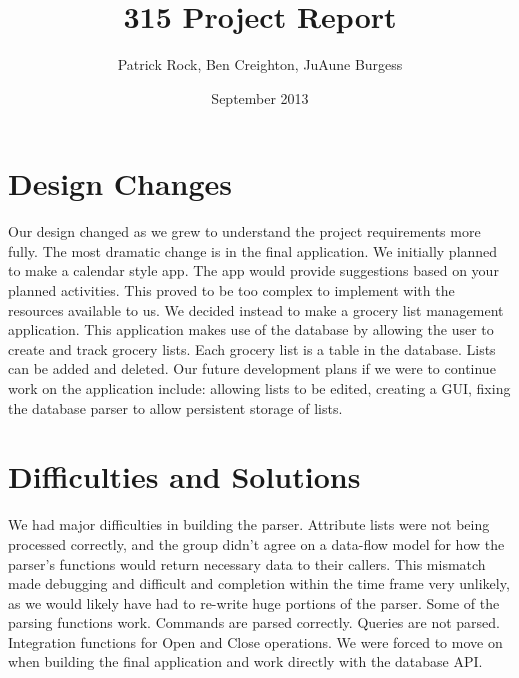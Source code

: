 \documentclass{article}
\title{315 Project Report}
\author{Patrick Rock, Ben Creighton, JuAune Burgess}
\date{September 2013}
\begin{document}
\maketitle

\section{Design Changes}
Our design changed as we grew to understand the project requirements more fully. The most dramatic change 
is in the final application. We initially planned to make a calendar style app. The app would provide suggestions
based on your planned activities. This proved to be too complex to implement with the resources available to us. 
We decided instead to make a grocery list management application. This application makes use of the database by 
allowing the user to create and track grocery lists. Each grocery list is a table in the database. Lists can 
be added and deleted. Our future development plans if we were to continue work on the application include:
allowing lists to be edited, creating a GUI, fixing the database parser to allow persistent storage of lists. 

\section{Difficulties and Solutions}
We had major difficulties in building the parser.
Attribute lists were not being processed correctly, and the group didn’t agree on a data-flow model for how the
parser's functions would return necessary data to their callers. This mismatch made debugging and difficult and
completion within the time frame very unlikely, as we would likely have had to re-write huge portions of the parser.
Some of the parsing functions work. Commands are parsed correctly. Queries are not parsed. Integration functions
for Open and Close operations. We were forced to move on when building the final application and work directly with
the database API. 
\end{document}
